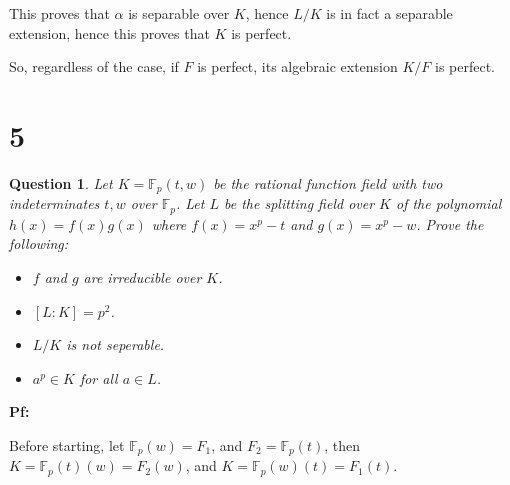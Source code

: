 \documentclass{article}
\newtheorem{question}{Question}
\begin{document}
This proves that $\alpha$ is separable over $K$, hence $L/K$ is in fact a separable extension, hence this proves that $K$ is perfect.

\hfil

So, regardless of the case, if $F$ is perfect, its algebraic extension $K/F$ is perfect.

\break

\section*{5}
\begin{myBox}[]{}
    \begin{question}
        Let $K=\mathbb{F}_p(t,w)$ be the rational function field with two indeterminates $t,w$ over $\mathbb{F}_p$. Let $L$ be the splitting field over $K$ of the polynomial $h(x)=f(x)g(x)$ where $f(x)=x^p-t$ and $g(x)=x^p-w$. Prove the following:
        \begin{itemize}
            \item[(a)] $f$ and $g$ are irreducible over $K$.
            \item[(b)] $[L:K]=p^2$.
            \item[(c)] $L/K$ is not seperable.
            \item[(d)] $a^p\in K$ for all $a\in L$.
        \end{itemize}
    \end{question}
\end{myBox}

\textbf{Pf:}

Before starting, let $\mathbb{F}_p(w) = F_1$, and $F_2 = \mathbb{F}_p(t)$, then $K=\mathbb{F}_p(t)(w) = F_2(w)$, and $K=\mathbb{F}_p(w)(t) = F_1(t)$.
\end{document}
